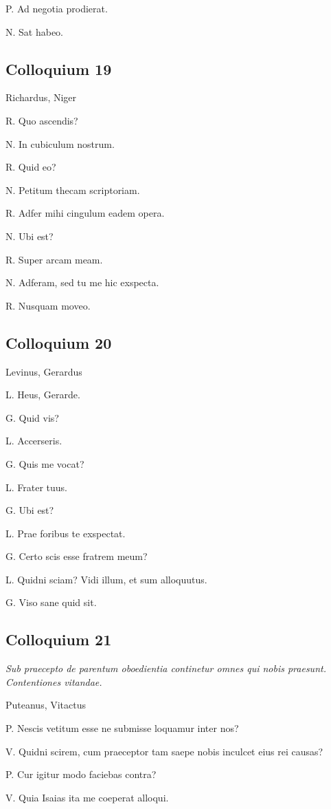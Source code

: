 \documentclass{article}
\begin{document}
P. Ad negotia prodierat. 

N. Sat habeo. 

\subsection{Colloquium 19}
Richardus, Niger

R. Quo ascendis?

N. In cubiculum nostrum.

R. Quid eo?

N. Petitum thecam scriptoriam. 

R. Adfer mihi cingulum eadem opera. 

N. Ubi est?

R. Super arcam meam. 

N. Adferam, sed tu me hic exspecta. 

R. Nusquam moveo.

\subsection{Colloquium 20}
Levinus, Gerardus

L. Heus, Gerarde. 

G. Quid vis?

L. Accerseris. 

G. Quis me vocat?

L. Frater tuus. 

G. Ubi est?

L. Prae foribus te exspectat. 

G. Certo scis esse fratrem meum?

L. Quidni sciam? Vidi illum, et sum alloquutus. 

G. Viso sane quid sit.

\subsection{Colloquium 21}
\emph{Sub praecepto de parentum oboedientia continetur omnes qui nobis praesunt. Contentiones vitandae.}

Puteanus, Vitactus

P. Nescis vetitum esse ne submisse loquamur inter nos?

V. Quidni scirem, cum praeceptor tam saepe nobis inculcet eius rei causas?

P. Cur igitur modo faciebas contra?

V. Quia Isaias ita me coeperat alloqui. 
\end{document}
